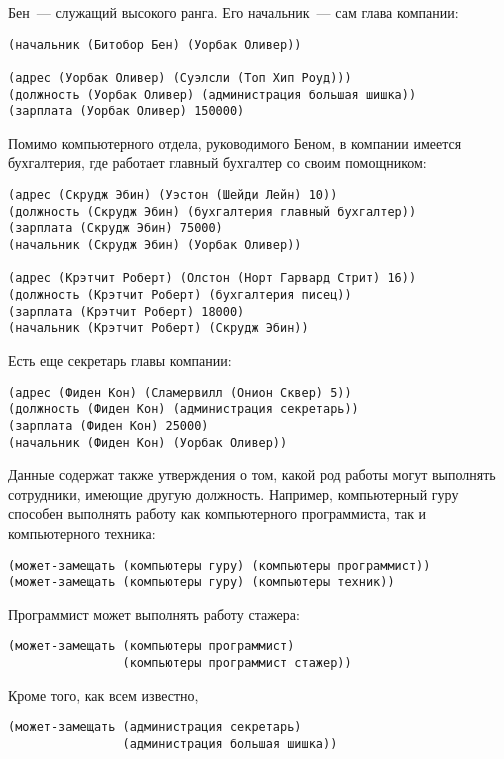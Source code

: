 Бен~--- служащий высокого ранга.  Его начальник~--- сам
глава компании:

\begin{Verbatim}[fontsize=\small]
(начальник (Битобор Бен) (Уорбак Оливер))

(адрес (Уорбак Оливер) (Суэлсли (Топ Хип Роуд)))
(должность (Уорбак Оливер) (администрация большая шишка))
(зарплата (Уорбак Оливер) 150000)
\end{Verbatim}

Помимо компьютерного отдела, руководимого Беном, в
компании имеется бухгалтерия, где работает главный бухгалтер со своим
помощником:

\begin{Verbatim}[fontsize=\small]
(адрес (Скрудж Эбин) (Уэстон (Шейди Лейн) 10))
(должность (Скрудж Эбин) (бухгалтерия главный бухгалтер))
(зарплата (Скрудж Эбин) 75000)
(начальник (Скрудж Эбин) (Уорбак Оливер))

(адрес (Крэтчит Роберт) (Олстон (Норт Гарвард Стрит) 16))
(должность (Крэтчит Роберт) (бухгалтерия писец))
(зарплата (Крэтчит Роберт) 18000)
(начальник (Крэтчит Роберт) (Скрудж Эбин))
\end{Verbatim}
Есть еще секретарь главы компании:

\begin{Verbatim}[fontsize=\small]
(адрес (Фиден Кон) (Сламервилл (Онион Сквер) 5))
(должность (Фиден Кон) (администрация секретарь))
(зарплата (Фиден Кон) 25000)
(начальник (Фиден Кон) (Уорбак Оливер))
\end{Verbatim}

Данные содержат также утверждения о том, какой род работы
могут выполнять сотрудники, имеющие другую должность.  Например,
компьютерный гуру способен выполнять работу как компьютерного
программиста, так и компьютерного техника:

\begin{Verbatim}[fontsize=\small]
(может-замещать (компьютеры гуру) (компьютеры программист))
(может-замещать (компьютеры гуру) (компьютеры техник))
\end{Verbatim}
Программист может выполнять работу стажера:

\begin{Verbatim}[fontsize=\small]
(может-замещать (компьютеры программист)
                (компьютеры программист стажер))
\end{Verbatim}
Кроме того, как всем известно,

\begin{Verbatim}[fontsize=\small]
(может-замещать (администрация секретарь)
                (администрация большая шишка))
\end{Verbatim}

